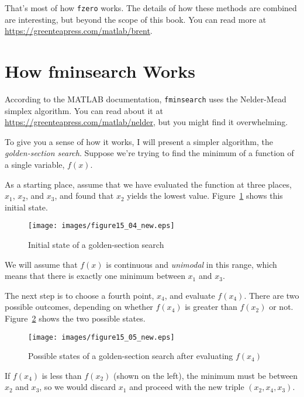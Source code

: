 That's most of how \lstinline{fzero} works.  The details of how these methods are combined are interesting, but beyond the scope of this book.  You can read more at \url{https://greenteapress.com/matlab/brent}.


\section{How fminsearch Works}
\label{howfminsearch}

According to the MATLAB documentation, \lstinline{fminsearch} uses the Nelder-Mead simplex algorithm.  You can read about it at \url{https://greenteapress.com/matlab/nelder}, but you might find it overwhelming.


To give you a sense of how it works, I will present a simpler algorithm, the \emph{golden-section search}.  Suppose we're trying to find the minimum of a function of a single variable, $f(x)$.

As a starting place, assume that we have evaluated the function at three places,
$x_1$, $x_2$, and $x_3$, and found that $x_2$ yields the lowest
value. Figure~\ref{fig:golden1} shows this initial state.

\begin{figure}[h]
\centerline{\texttt{[image: images/figure15\_04\_new.eps]}}
\caption{Initial state of a golden-section search}
\label{fig:golden1}
\end{figure}

We will assume that $f(x)$ is continuous and \emph{unimodal} in this range, which means that there is exactly one minimum between $x_1$ and $x_3$.


The next step is to choose a fourth point, $x_4$, and evaluate
$f(x_4)$.  There are two possible outcomes, depending on whether
$f(x_4)$ is greater than $f(x_2)$ or not.
Figure~\ref{fig:golden2} shows the two possible states.

\begin{figure}[h]
\centerline{\texttt{[image: images/figure15\_05\_new.eps]}}
\caption{Possible states of a golden-section search after evaluating $f(x_4)$}
\label{fig:golden2}
\end{figure}

If $f(x_4)$ is less than $f(x_2)$ (shown on the left), the
minimum must be between $x_2$ and $x_3$, so we would discard $x_1$ and proceed with the new triple $(x_2, x_4, x_3)$.


